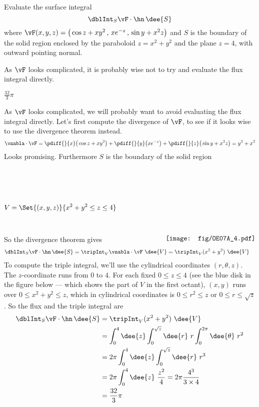 \begin{question}[M317 2007A] %
Evaluate the surface integral
\begin{equation*}
\dblInt_S \vF\cdot\hn\,\dee{S}
\end{equation*}
where $\vF(x, y, z) = \big(\cos z + xy^2\,,\, xe^{-z}\,,\, \sin y + x^2 z\big)$ 
and $S$ is the boundary of the solid region
enclosed by the paraboloid $z = x^2 + y^2$ and the plane $z = 4$, with outward pointing normal.
\end{question}

\begin{hint} 
As $\vF$ looks complicated, it is probably wise not to try and evaluate
the flux integral directly.
\end{hint}

\begin{answer} 
$\frac{32}{3}\pi$
\end{answer}

\begin{solution} 
As $\vF$ looks complicated, we will probably want to avoid evaluating
the flux integral directly. Let's first compute the divergence of $\vF$,
to see if it looks wise to use the divergence theorem instead.
\begin{align*}
\vnabla\cdot\vF = 
   \pdiff{}{x}\big(\cos z + xy^2\big)
   +\pdiff{}{y}\big(xe^{-z}\big)
   +\pdiff{}{z}\big(\sin y + x^2 z\big)
=y^2+x^2
\end{align*}
Looks promising. Furthermore $S$ is the boundary of the solid region
\begin{equation*}
V=\Set{(x,y,z)}{x^2+y^2\le z\le 4}
\hskip1.0in
\raisebox{-45pt}[65pt][30pt]{\texttt{[image: fig/OE07A\_4.pdf]}}
\end{equation*}
So the divergence theorem gives
\begin{align*}
\dblInt_S \vF \cdot\hn\,\dee{S}
&=\tripInt_V \vnabla\cdot\vF\ \dee{V} 
=\tripInt_V  (x^2+y^2)\ \dee{V} 
\end{align*}
To compute the triple integral, we'll use the cylindrical coordinates $(r,\theta,z)$.
The $z$-coordinate runs from $0$ to $4$. For each fixed $0\le z \le 4$
(see the blue disk in the figure below --- which shows the part of $V$ in the first octant),
$(x,y)$ runs over $0\le x^2+y^2 \le z$, which in cylindrical coordinates
is $0\le r^2\le z$ or $0\le r\le\sqrt{z}$. 
So the flux and the triple integral are
\begin{align*}
\dblInt_S \vF \cdot\hn\,\dee{S}
&=\tripInt_V  (x^2+y^2)\ \dee{V} \\
&=\int_0^4\dee{z}\int_0^{\sqrt{z}}\dee{r}\ r\int_0^{2\pi}\dee{\theta}\   r^2 \\
&=2\pi \int_0^4\dee{z}\int_0^{\sqrt{z}}\dee{r}\ r^3 \\
&=2\pi \int_0^4\dee{z}\ \frac{z^2}{4}
=2\pi \frac{4^3}{3\times 4}\\
&=\frac{32}{3}\pi
\end{align*}


\end{solution}

